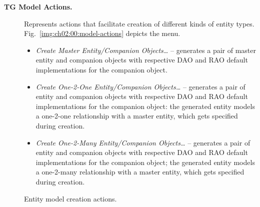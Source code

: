  \begin{description}
    \item[\textbf{TG Model Actions.}] Represents actions that facilitate creation of different kinds of entity types.
    Fig.~\ref{img:ch02:00:model-actions} depicts the menu.
    
    \begin{itemize}
     \item \emph{Create Master Entity/Companion Objects\ldots} -- generates a pair of master entity and companion objects with respective DAO and RAO default implementations for the companion object.
     \item \emph{Create One-2-One Entity/Companion Objects\ldots} -- generates a pair of entity and companion objects with respective DAO and RAO default implementations for the companion object: the generated entity models a one-2-one relationship with a master entity, which gets specified during creation.
     \item \emph{Create One-2-Many Entity/Companion Objects\ldots} -- generates a pair of entity and companion objects with respective DAO and RAO default implementations for the companion object; the generated entity models a one-2-many relationship with a master entity, which gets specified during creation.
    \end{itemize}

    \begin{image}{Entity model creation actions.}{\label{img:ch02:00:model-actions}}
\end{image}
\end{description}
